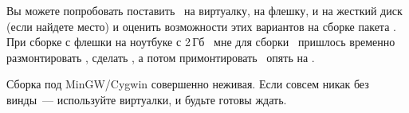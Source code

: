 Вы можете попробовать поставить \linux\ на виртуалку, на флешку, и на жесткий
диск (если найдете место) и оценить возможности этих вариантов на сборке пакета
. При сборке с флешки на ноутбуке с 2\,Гб \ram\ мне для сборки
\ пришлось временно размонтировать , сделать
, а потом примонтировать \
опять на .

Сборка под MinGW/Cygwin совершенно неживая. Если совсем никак без винды\ ---
используйте виртуалки, и будьте готовы ждать.

% 
% 
% 
% 
% 
% 
% 
% 
% 
% 
% 
% 
% 
